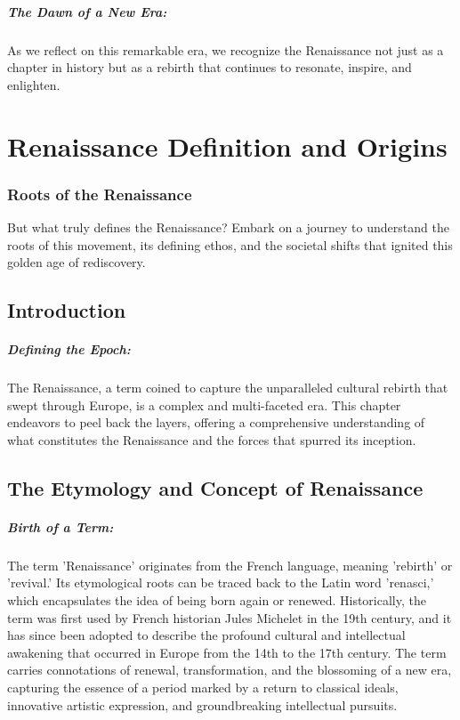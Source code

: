 \documentclass[a4paper,12pt]{book}
\begin{document}
\paragraph{The Dawn of a New Era:}
As we reflect on this remarkable era, we recognize the Renaissance not just as a chapter in history but as a rebirth that continues to resonate, inspire, and enlighten.

\chapter{Renaissance Definition and Origins}
\subsection*{Roots of the Renaissance}
But what truly defines the Renaissance? Embark on a journey to understand the roots of this movement, its defining ethos, and the societal shifts that ignited this golden age of rediscovery.

\section*{Introduction}

\paragraph{Defining the Epoch:}
The Renaissance, a term coined to capture the unparalleled cultural rebirth that swept through Europe, is a complex and multi-faceted era. This chapter endeavors to peel back the layers, offering a comprehensive understanding of what constitutes the Renaissance and the forces that spurred its inception.

\section*{The Etymology and Concept of Renaissance}

\paragraph{Birth of a Term:}
The term 'Renaissance' originates from the French language, meaning 'rebirth' or 'revival.' Its etymological roots can be traced back to the Latin word 'renasci,' which encapsulates the idea of being born again or renewed. Historically, the term was first used by French historian Jules Michelet in the 19th century, and it has since been adopted to describe the profound cultural and intellectual awakening that occurred in Europe from the 14th to the 17th century. The term carries connotations of renewal, transformation, and the blossoming of a new era, capturing the essence of a period marked by a return to classical ideals, innovative artistic expression, and groundbreaking intellectual pursuits.
\end{document}
